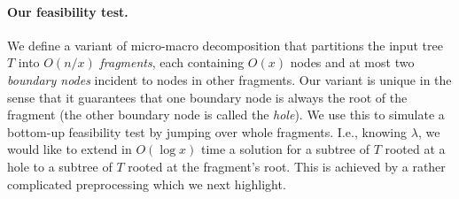 \documentclass[11pt,a4paper]{article}
\theoremstyle{definition}
\theoremstyle{remark}
\begin{document}
 

%

\paragraph{Our feasibility test.}
We define a variant of micro-macro decomposition that partitions the input tree $T$ into $O(n/x)$ {\em fragments}, each containing $O(x)$ nodes and at most two {\em boundary nodes} incident to nodes in other fragments. Our variant is unique in the sense that it guarantees that one boundary node is always the root of the fragment (the other boundary node is called the {\em hole}). We use this to
 simulate a bottom-up feasibility test by jumping over whole 
fragments. I.e., knowing $\lambda$, we would like to extend in $O(\log x)$ time a solution for a subtree of $T$ rooted at a hole to a subtree of $T$ rooted at the fragment's root. This is achieved by a rather complicated preprocessing which we next highlight.
\end{document}
